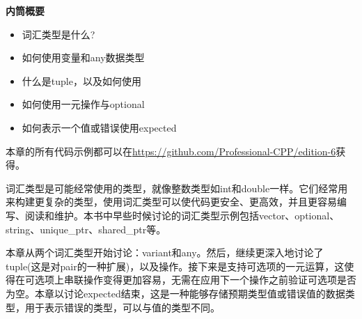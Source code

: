\noindent
\textbf{内筒概要}

\begin{itemize}
\item
词汇类型是什么?

\item
如何使用变量和any数据类型

\item
什么是tuple，以及如何使用

\item
如何使用一元操作与optional

\item
如何表示一个值或错误使用expected
\end{itemize}

本章的所有代码示例都可以在\url{https://github.com/Professional-CPP/edition-6}获得。

词汇类型是可能经常使用的类型，就像整数类型如int和double一样。它们经常用来构建更复杂的类型，使用词汇类型可以使代码更安全、更高效，并且更容易编写、阅读和维护。本书中早些时候讨论的词汇类型示例包括vector、optional、string、unique\_ptr、shared\_ptr等。

本章从两个词汇类型开始讨论：variant和any。然后，继续更深入地讨论了tuple(这是对pair的一种扩展)，以及操作。接下来是支持可选项的一元运算，这使得在可选项上串联操作变得更加容易，无需在应用下一个操作之前验证可选项是否为空。本章以讨论expected结束，这是一种能够存储预期类型值或错误值的数据类型，用于表示错误的类型，可以与值的类型不同。
